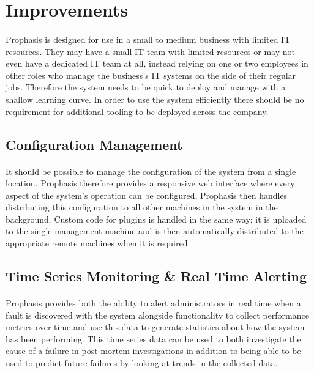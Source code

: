 \documentclass[bsc,logo,twoside,singlespacing,notimes]{infthesis}
\begin{document}
\section{Improvements}
\paragraph*{}
	Prophasis is designed for use in a small to medium business with limited IT
	resources.  They may have a small IT team with limited resources or may not
	even have a dedicated IT team at all, instead relying on one or two employees
	in other roles who manage the business's IT systems on the side of their
	regular jobs. Therefore the system needs to be quick to deploy and manage with
	a shallow learning curve. In order to use the system efficiently there should
	be no requirement for additional tooling to be deployed across the company.

\subsection{Configuration Management}
\paragraph*{}
	It should be possible to manage the configuration of the system from a single
	location.  Prophasis therefore provides a responsive web interface where every
	aspect of the system's operation can be configured, Prophasis then handles
	distributing this configuration to all other machines in the system in the
	background. Custom code for plugins is handled in the same way; it is uploaded
	to the single management machine and is then automatically distributed to the
	appropriate remote machines when it is required.

\subsection{Time Series Monitoring \& Real Time Alerting}
\paragraph*{}
	Prophasis provides both the ability to alert administrators in real time when a
	fault is discovered with the system alongside functionality to collect
	performance metrics over time and use this data to generate statistics about
	how the system has been performing.  This time series data can be used to both
	investigate the cause of a failure in post-mortem investigations in addition to
	being able to be used to predict future failures by looking at trends in the
	collected data.
\end{document}
